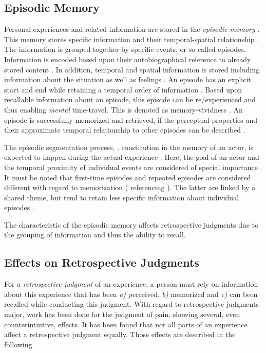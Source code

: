 \subsection{Episodic Memory}
Personal experiences and related information are stored in the \emph{episodic memory} \citep{tulving_episodic_1972}.
This memory stores specific information and their temporal-spatial relationship \citep[][p.~385]{tulving_episodic_1972}.
The information is grouped together by specific events, or so-called episodes.
Information is encoded based upon their autobiographical reference to already stored content \citep[][p.~385f.]{tulving_episodic_1972}.
In addition, temporal and spatial information is stored including information about the situation as well as feelings \citep[][p.~385f.]{tulving_episodic_1972}.
An episode has an explicit start and end while retaining a temporal order of information \citep[][p.~262]{conway_construction_2000}.
Based upon recallable information about an episode, this episode can be re\=/experienced and thus enabling \emph{mental} time-travel.
This is denoted as memory-vividness \citep{conway_construction_2000}.
An episode is successfully memorized and retrieved, if the perceptual properties and their approximate temporal relationship to other episodes can be described \citep{conway_construction_2000}.

The episodic segmentation process, \ie, constitution in the memory of an actor, is expected to happen during the actual experience \citep[][]{ezzyat_what_2011, kurby_segmentation_2008}.
Here, the goal of an actor and the temporal proximity of individual events are considered of special importance \citep[][]{black_episodes_1979}.
It must be noted that first-time episodes and repeated episodes are considered different with regard to memorization (\citet{conway_construction_2000} referencing \citet{barsalou_content_1988}).
The latter are linked by a shared theme, but tend to retain less specific information about individual episodes \citep{robinson_first_1992}.

The characteristic of the episodic memory affects retrospective judgments due to the grouping of information and thus the ability to recall.

\subsection{Effects on Retrospective Judgments}\label{chap03:effects}
For a \emph{retrospective judgment} of an experience, a person must rely on information about this experience that has been \emph{a)} perceived, \emph{b)} memorized and \emph{c)} can been recalled while conducting this judgment.
With regard to retrospective judgments major, work has been done for the judgment of pain, showing several, even counterintuitive, effects.
It has been found that not all parts of an experience affect a retrospective judgment equally.
Those effects are described in the following.

